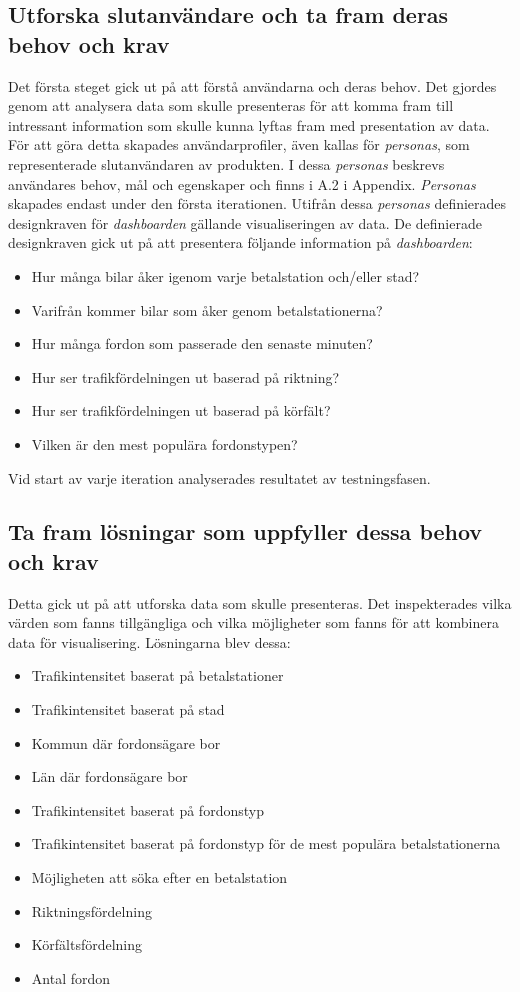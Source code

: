 \documentclass[12pt]{kththesis}
\begin{document}
\subsection{ Utforska slutanvändare och ta fram deras behov och krav
}
Det första steget gick ut på att förstå användarna och deras behov. Det gjordes genom att analysera data som skulle presenteras för att komma fram till intressant information som skulle kunna lyftas fram med presentation av data. För att göra detta skapades användarprofiler, även kallas för \textit{personas}, som representerade slutanvändaren av produkten. I dessa \textit{personas} beskrevs användares behov, mål och egenskaper och finns i A.2 i Appendix. \textit{Personas} skapades endast under den första iterationen. Utifrån dessa \textit{personas} definierades designkraven för \textit{dashboarden} gällande visualiseringen av data. De definierade designkraven gick ut på att presentera följande information på \textit{dashboarden}:

\begin{itemize}
\item Hur många bilar åker igenom varje betalstation och/eller stad?
\item Varifrån kommer bilar som åker genom betalstationerna? 
\item Hur många fordon som passerade den senaste minuten? 
\item Hur ser trafikfördelningen ut baserad på riktning? 
\item Hur ser trafikfördelningen ut baserad på körfält? 
\item Vilken är den mest populära fordonstypen?
\end{itemize}

Vid start av varje iteration analyserades resultatet av testningsfasen. 

\subsection{Ta fram lösningar som uppfyller dessa behov och krav }
Detta gick ut på att utforska data som skulle presenteras. Det inspekterades vilka värden som fanns tillgängliga och vilka möjligheter som fanns för att kombinera data för visualisering. Lösningarna blev dessa:
 
\begin{itemize}
\item Trafikintensitet baserat på betalstationer
\item Trafikintensitet baserat på stad
\item Kommun där fordonsägare bor
\item Län där fordonsägare bor
\item Trafikintensitet baserat på fordonstyp 
\item Trafikintensitet baserat på fordonstyp för de mest populära betalstationerna
\item Möjligheten att söka efter en betalstation
\item Riktningsfördelning
\item Körfältsfördelning
\item Antal fordon
\end{itemize}
\end{document}
